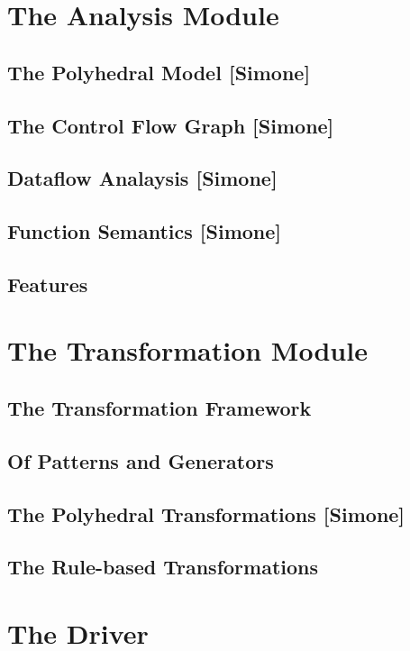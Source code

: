 

\section{The Analysis Module}
\subsection{The Polyhedral Model [Simone]}
\subsection{The Control Flow Graph [Simone]}
\subsection{Dataflow Analaysis [Simone]}
\subsection{Function Semantics [Simone]}
\subsection{Features}

\section{The Transformation Module}
\subsection{The Transformation Framework}
\subsection{Of Patterns and Generators}
\label{sec:Compiler.Transform.Pattern}
\subsection{The Polyhedral Transformations [Simone]}
\subsection{The Rule-based Transformations}



\section{The Driver} \label{sec:Driver}
